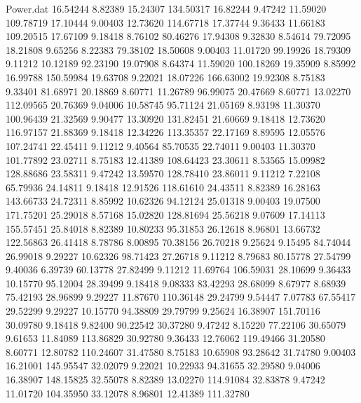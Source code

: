 \begin{filecontents}{Power.dat}
  16.54244    8.82389   15.24307  134.50317
  16.82244    9.47242   11.59020  109.78719
  17.10444    9.00403   12.73620  114.67718
  17.37744    9.36433   11.66183  109.20515
  17.67109    9.18418    8.76102   80.46276
  17.94308    9.32830    8.54614   79.72095
  18.21808    9.65256    8.22383   79.38102
  18.50608    9.00403   11.01720   99.19926
  18.79309    9.11212   10.12189   92.23190
  19.07908    8.64374   11.59020  100.18269
  19.35909    8.85992   16.99788  150.59984
  19.63708    9.22021   18.07226  166.63002
  19.92308    8.75183    9.33401   81.68971
  20.18869    8.60771   11.26789   96.99075
  20.47669    8.60771   13.02270  112.09565
  20.76369    9.04006   10.58745   95.71124
  21.05169    8.93198   11.30370  100.96439
  21.32569    9.90477   13.30920  131.82451
  21.60669    9.18418   12.73620  116.97157
  21.88369    9.18418   12.34226  113.35357
  22.17169    8.89595   12.05576  107.24741
  22.45411    9.11212    9.40564   85.70535
  22.74011    9.00403   11.30370  101.77892
  23.02711    8.75183   12.41389  108.64423
  23.30611    8.53565   15.09982  128.88686
  23.58311    9.47242   13.59570  128.78410
  23.86011    9.11212    7.22108   65.79936
  24.14811    9.18418   12.91526  118.61610
  24.43511    8.82389   16.28163  143.66733
  24.72311    8.85992   10.62326   94.12124
  25.01318    9.00403   19.07500  171.75201
  25.29018    8.57168   15.02820  128.81694
  25.56218    9.07609   17.14113  155.57451
  25.84018    8.82389   10.80233   95.31853
  26.12618    8.96801   13.66732  122.56863
  26.41418    8.78786    8.00895   70.38156
  26.70218    9.25624    9.15495   84.74044
  26.99018    9.29227   10.62326   98.71423
  27.26718    9.11212    8.79683   80.15778
  27.54799    9.40036    6.39739   60.13778
  27.82499    9.11212   11.69764  106.59031
  28.10699    9.36433   10.15770   95.12004
  28.39499    9.18418    9.08333   83.42293
  28.68099    8.67977    8.68939   75.42193
  28.96899    9.29227   11.87670  110.36148
  29.24799    9.54447    7.07783   67.55417
  29.52299    9.29227   10.15770   94.38809
  29.79799    9.25624   16.38907  151.70116
  30.09780    9.18418    9.82400   90.22542
  30.37280    9.47242    8.15220   77.22106
  30.65079    9.61653   11.84089  113.86829
  30.92780    9.36433   12.76062  119.49466
  31.20580    8.60771   12.80782  110.24607
  31.47580    8.75183   10.65908   93.28642
  31.74780    9.00403   16.21001  145.95547
  32.02079    9.22021   10.22933   94.31655
  32.29580    9.04006   16.38907  148.15825
  32.55078    8.82389   13.02270  114.91084
  32.83878    9.47242   11.01720  104.35950
  33.12078    8.96801   12.41389  111.32780

\end{filecontents}
